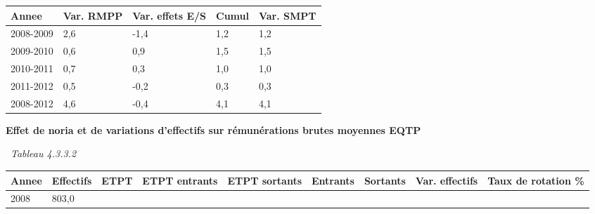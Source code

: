 \begin{longtable}[]{@{}lllll@{}}
\toprule
Annee & Var. RMPP & Var. effets E/S & Cumul & Var. SMPT\tabularnewline
\midrule
\endhead
2008-2009 & 2,6 & -1,4 & 1,2 & 1,2\tabularnewline
2009-2010 & 0,6 & 0,9 & 1,5 & 1,5\tabularnewline
2010-2011 & 0,7 & 0,3 & 1,0 & 1,0\tabularnewline
2011-2012 & 0,5 & -0,2 & 0,3 & 0,3\tabularnewline
2008-2012 & 4,6 & -0,4 & 4,1 & 4,1\tabularnewline
\bottomrule
\end{longtable}

\textbf{Effet de noria et de variations d'effectifs sur rémunérations
brutes moyennes EQTP}

~\emph{Tableau 4.3.3.2}

\begin{longtable}[]{@{}lllllllll@{}}
\toprule
\begin{minipage}[b]{0.05\columnwidth}\raggedright
Annee\strut
\end{minipage} & \begin{minipage}[b]{0.08\columnwidth}\raggedright
Effectifs\strut
\end{minipage} & \begin{minipage}[b]{0.05\columnwidth}\raggedright
ETPT\strut
\end{minipage} & \begin{minipage}[b]{0.10\columnwidth}\raggedright
ETPT entrants\strut
\end{minipage} & \begin{minipage}[b]{0.10\columnwidth}\raggedright
ETPT sortants\strut
\end{minipage} & \begin{minipage}[b]{0.07\columnwidth}\raggedright
Entrants\strut
\end{minipage} & \begin{minipage}[b]{0.07\columnwidth}\raggedright
Sortants\strut
\end{minipage} & \begin{minipage}[b]{0.11\columnwidth}\raggedright
Var. effectifs\strut
\end{minipage} & \begin{minipage}[b]{0.14\columnwidth}\raggedright
Taux de rotation \%\strut
\end{minipage}\tabularnewline
\midrule
\endhead
\begin{minipage}[t]{0.05\columnwidth}\raggedright
2008\strut
\end{minipage} & \begin{minipage}[t]{0.08\columnwidth}\raggedright
803,0\strut
\end{minipage} & \begin{minipage}[t]{0.05\columnwidth}\raggedright

\end{minipage}
\end{longtable}
